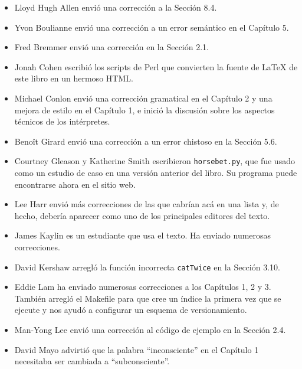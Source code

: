 \documentclass[10pt]{book}
\begin{document}
\begin{itemize}

\small
\item Lloyd Hugh Allen envió una corrección a la Sección 8.4.

\item Yvon Boulianne envió una corrección a un error semántico en
el Capítulo 5.

\item Fred Bremmer envió una corrección en la Sección 2.1.

\item Jonah Cohen escribió los scripts de Perl que convierten la
fuente de LaTeX de este libro en un hermoso HTML.

\item Michael Conlon envió una corrección gramatical en el Capítulo 2
y una mejora de estilo en el Capítulo 1, e inició la discusión
sobre los aspectos técnicos de los intérpretes.

\item Beno\^{i}t Girard envió una
corrección a un error chistoso en la Sección 5.6.

\item Courtney Gleason y Katherine Smith escribieron {\tt horsebet.py}, que
fue usado como un estudio de caso en una versión anterior del libro.  Su
programa puede encontrarse ahora en el sitio web.

\item Lee Harr envió más correcciones de las que cabrían acá en una lista
y, de hecho, debería aparecer como uno de los principales editores
del texto.

\item James Kaylin es un estudiante que usa el texto. Ha enviado
numerosas correcciones.

\item David Kershaw arregló la función incorrecta {\tt catTwice} en la Sección
3.10.

\item Eddie Lam ha enviado numerosas correcciones a los Capítulos
1, 2 y 3.
También arregló el Makefile para que cree un índice la primera vez que
se ejecute y nos ayudó a configurar un esquema de versionamiento.

\item Man-Yong Lee envió una corrección al código de ejemplo en la
Sección 2.4.

\item David Mayo advirtió que la palabra ``inconsciente''
en el Capítulo 1 necesitaba
ser cambiada a ``subconsciente''.


\end{itemize}
\end{document}
